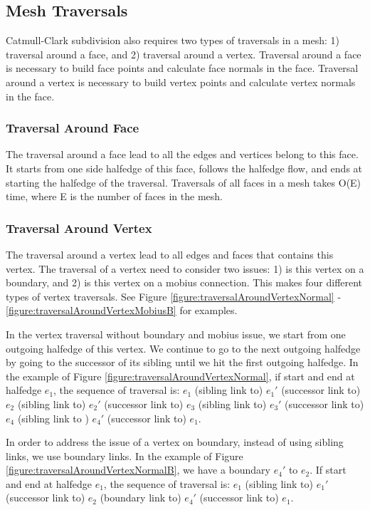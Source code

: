 \documentclass[12pt]{article}
\begin{document}
\subsection{Mesh Traversals} 
Catmull-Clark subdivision also requires two types of traversals in a mesh: 1) traversal around a face, and 2) traversal around a vertex. Traversal around a face is necessary to build face points and calculate face normals in the face. Traversal around a vertex is necessary to build vertex points and calculate vertex normals in the face.

\subsubsection{Traversal Around Face}
The traversal around a face lead to all the edges and vertices belong to this face. It starts from one side halfedge of this face, follows the halfedge flow, and ends at starting the halfedge of the traversal.
Traversals of all faces in a mesh takes O(E) time, where E is the number of faces in the mesh.

\subsubsection{Traversal Around Vertex}
The traversal around a vertex lead to all edges and faces that contains this vertex. The traversal of a vertex need to consider two issues: 1) is this vertex on a boundary, and  2) is this vertex on a mobius connection. This makes four different types of vertex traversals. See Figure \ref{figure:traversalAroundVertexNormal} - \ref{figure:traversalAroundVertexMobiusB} for examples.

In the vertex traversal without boundary and mobius issue, we start from one outgoing halfedge of this vertex. We continue to go to the next outgoing halfedge by going to the successor of its sibling until we hit the first outgoing halfedge. In the example of Figure \ref{figure:traversalAroundVertexNormal}, if start and end at halfedge $e_1$, the sequence of traversal is: $e_1$ (sibling link to) $e_1'$ (successor link to) $e_2$ (sibling link to) $e_2'$ (successor link to) $e_3$ (sibling link to) $e_3'$ (successor link to) $e_4$ (sibling link to ) $e_4'$  (successor link to)  $e_1$.

In order to address the issue of a vertex on boundary, instead of using sibling links, we use boundary links. In the example of Figure \ref{figure:traversalAroundVertexNormalB}, we have a boundary $e_4'$ to $e_2$. If start and end at halfedge $e_1$, the sequence of traversal is: $e_1$ (sibling link to) $e_1'$ (successor link to) $e_2$ (boundary link to) $e_4'$ (successor link to)  $e_1$.
\end{document}

